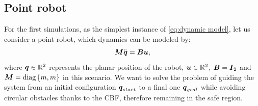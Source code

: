 \subsection{Point robot}
For the first simulations, as the simplest instance of \eqref{eq:dynamic model}, let us consider a point robot, which dynamics can be modeled by: 
\begin{equation}\label{eq:pr dyn}
    \boldsymbol{M}\ddot{{\boldsymbol{q}}} = \boldsymbol{B}\boldsymbol{u},
\end{equation}
where ${\boldsymbol{q}} \in \mathbb{R}^2$ represents the planar position of the robot, $\boldsymbol{u} \in \mathbb{R}^2$, $\boldsymbol{B}=\boldsymbol{I}_{2}$ and $\boldsymbol{M} = \mbox{diag}\left\{m, m\right\}$ in this scenario.
We want to solve the problem of guiding the system from an initial configuration ${\boldsymbol{q}}_{start}$ to a final one ${\boldsymbol{q}}_{goal}$ while avoiding circular obstacles thanks to the CBF, therefore remaining in the safe region.
